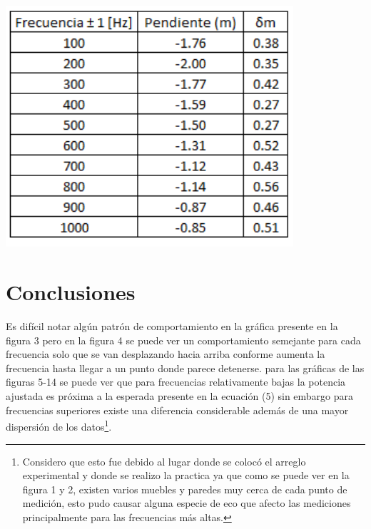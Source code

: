 \documentclass[DIV=calc, paper=a4, fontsize=11pt]{scrartcl}
\newenvironment{Figura}
  {\par\medskip\noindent\minipage{\linewidth}}
  {\endminipage\par\medskip}
\begin{document}
\begin{multicols}{2}
\begin{Figura}
\centering
    \includegraphics[width=0.8\textwidth]{pendientes.PNG}
    \label{fig}
\end{Figura}









\section*{Conclusiones}

Es difícil notar algún patrón de comportamiento en la gráfica presente en la figura 3 pero en la figura 4 se puede ver un comportamiento semejante para cada frecuencia solo que se van desplazando hacia arriba conforme aumenta la frecuencia hasta llegar a un punto donde parece detenerse. para las gráficas de las figuras 5-14 se puede ver que para frecuencias relativamente bajas la potencia ajustada es próxima a la esperada presente en la ecuación (5) sin embargo para frecuencias superiores existe una diferencia considerable además de una mayor dispersión de los datos\footnote{Considero que esto fue debido al lugar donde se colocó el arreglo experimental y donde se realizo la practica ya que como se puede ver en la figura 1 y 2, existen varios muebles y paredes muy cerca de cada punto de medición, esto pudo causar alguna especie de eco que afecto las mediciones principalmente para las frecuencias más altas.}. 
  
\begin{thebibliography}{99}


\end{thebibliography}
\end{multicols}
\end{document}
